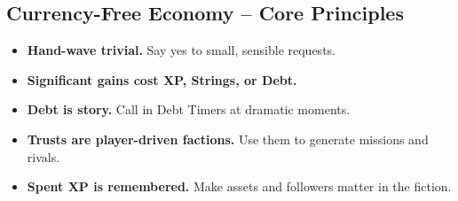 \subsection{Currency-Free Economy -- Core Principles}
\label{ref:principles}

\begin{itemize}
  \item \textbf{Hand-wave trivial.} Say yes to small, sensible requests.
  \item \textbf{Significant gains cost XP, Strings, or Debt.}
  \item \textbf{Debt is story.} Call in Debt Timers at dramatic moments.
  \item \textbf{Trusts are player-driven factions.} Use them to generate missions and rivals.
  \item \textbf{Spent XP is remembered.} Make assets and followers matter in the fiction.
\end{itemize}